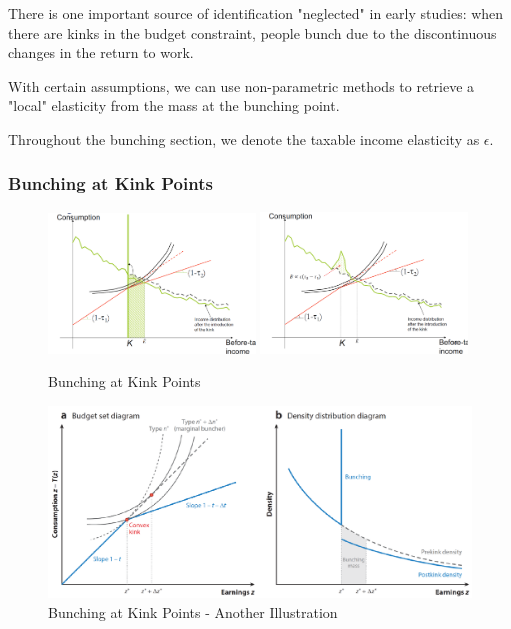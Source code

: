                 There is one important source of identification "neglected" in early studies: when there are kinks in the budget constraint, people bunch due to the discontinuous changes in the return to work.

                With certain assumptions, we can use non-parametric methods to retrieve a "local" elasticity from the mass at the bunching point.

                Throughout the bunching section, we denote the taxable income elasticity as $\epsilon$.

            \subsubsection{Bunching at Kink Points}

                \begin{figure}[H]
                    \centering
                    \includegraphics[width=0.49\textwidth]{images/ch13/13_bunching_1.png}
                    \includegraphics[width=0.49\textwidth]{images/ch13/13_bunching_2.png}
                    \caption{Bunching at Kink Points}
                \end{figure}


                \begin{figure}[H]
                    \centering
                    \includegraphics[width=5in]{images/ch13/13_bunching_3.png}
                    \caption{Bunching at Kink Points - Another Illustration}
                \end{figure}

